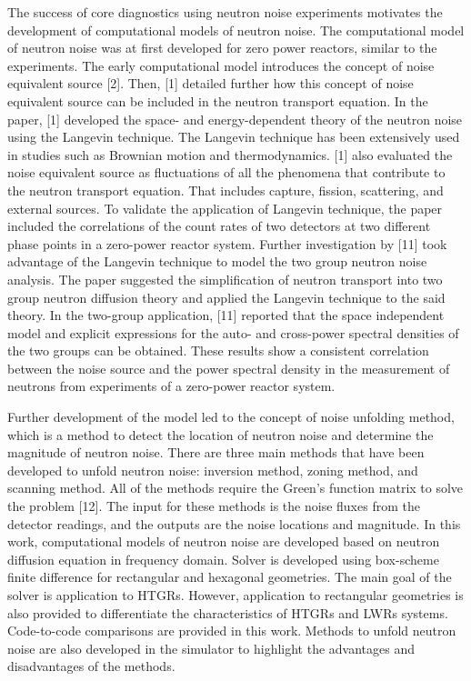 \documentclass{uiucthesis2021}
\begin{document}
The success of core diagnostics using neutron noise experiments motivates the development of computational models of neutron noise. The computational model of neutron noise was at first developed for zero power reactors, similar to the experiments. The early computational model introduces the concept of noise equivalent source [2]. Then, [1] detailed further how this concept of noise equivalent source can be included in the neutron transport equation. In the paper, [1] developed the space- and energy-dependent theory of the neutron noise using the Langevin technique. The Langevin technique has been extensively used in studies such as Brownian motion and thermodynamics. [1] also evaluated the noise equivalent source as fluctuations of all the phenomena that contribute to the neutron transport equation. That includes capture, fission, scattering, and external sources. To validate the application of Langevin technique, the paper included the correlations of the count rates of two detectors at two different phase points in a zero-power reactor system. Further investigation by [11] took advantage of the Langevin technique to model the two group neutron noise analysis. The paper suggested the simplification of neutron transport into two group neutron diffusion theory and applied the Langevin technique to the said theory. In the two-group application, [11] reported that the space independent model and explicit expressions for the auto- and cross-power spectral densities of the two groups can be obtained. These results show a consistent correlation between the noise source and the power spectral density in the measurement of neutrons from experiments of a zero-power reactor system. 

Further development of the model led to the concept of noise unfolding method, which is a method to detect the location of neutron noise and determine the magnitude of neutron noise. There are three main methods that have been developed to unfold neutron noise: inversion method, zoning method, and scanning method. All of the methods require the Green’s function matrix to solve the problem [12]. The input for these methods is the noise fluxes from the detector readings, and the outputs are the noise locations and magnitude.
In this work, computational models of neutron noise are developed based on neutron diffusion equation in frequency domain. Solver is developed using box-scheme finite difference for rectangular and hexagonal geometries. The main goal of the solver is application to HTGRs. However, application to rectangular geometries is also provided to differentiate the characteristics of HTGRs and LWRs systems. Code-to-code comparisons are provided in this work. Methods to unfold neutron noise are also developed in the simulator to highlight the advantages and disadvantages of the methods. 
\end{document}
